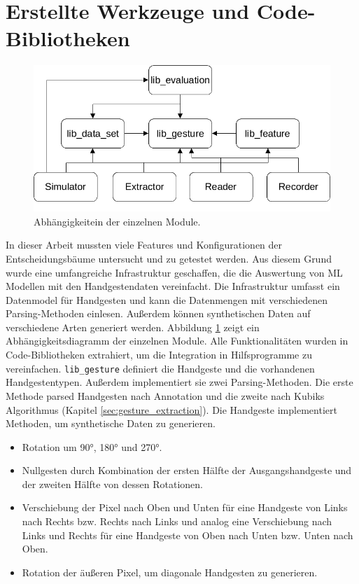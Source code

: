 \section{Erstellte Werkzeuge und Code-Bibliotheken}
\label{sec:recorder}
\begin{figure}
    \centering
    \includegraphics[width=0.75\linewidth]{images/architecture_overview.jpg}
    \caption{Abhängigkeitein der einzelnen Module.}
    \label{fig:architecture_overview}
\end{figure}
In dieser Arbeit mussten viele Features und Konfigurationen der Entscheidungsbäume untersucht und zu getestet werden. Aus diesem Grund wurde eine umfangreiche Infrastruktur geschaffen, die die
Auswertung von ML Modellen mit den Handgestendaten vereinfacht. Die Infrastruktur umfasst ein Datenmodel für Handgesten und kann die Datenmengen mit verschiedenen Parsing-Methoden einlesen.
Außerdem können synthetischen Daten auf verschiedene Arten generiert werden. Abbildung \ref{fig:architecture_overview} zeigt ein Abhängigkeitsdiagramm der einzelnen Module.
Alle Funktionalitäten wurden in Code-Bibliotheken extrahiert, um die Integration in Hilfsprogramme zu vereinfachen.
\newline
\newline
\texttt{lib\_gesture} definiert die Handgeste und die vorhandenen Handgestentypen. Außerdem implementiert sie zwei Parsing-Methoden. Die erste Methode parsed Handgesten nach Annotation und die
zweite nach Kubiks Algorithmus (Kapitel \ref{sec:gesture_extraction}). Die Handgeste implementiert Methoden, um synthetische Daten zu generieren.
\begin{itemize}
    \item Rotation um 90°, 180° und 270°.
    \item Nullgesten durch Kombination der ersten Hälfte der Ausgangshandgeste und der zweiten Hälfte von dessen Rotationen.
    \item Verschiebung der Pixel nach Oben und Unten für eine Handgeste von Links nach Rechts bzw. Rechts nach Links und analog eine Verschiebung nach Links und Rechts für eine Handgeste von Oben nach Unten bzw.
    Unten nach Oben.
    \item Rotation der äußeren Pixel, um diagonale Handgesten zu generieren.
\end{itemize}
